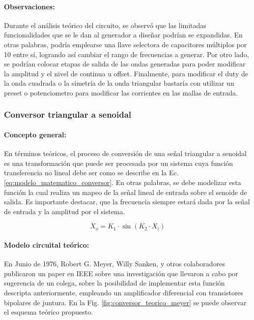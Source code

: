 \paragraph{Observaciones:} Durante el an\'alisis te\'orico del circuito, se observ\'o que las limitadas funcionalidades que se le dan al generador a dise\~nar podr\'ian se expandidas. En otras palabras,
podr\'ia emplearse una llave selectora de capacitores m\'ultiplos por 10 entre s\'i, logrando as\'i cambiar el rango de frecuencias a generar. Por otro lado, se podr\'ian colocar etapas de salida de las ondas
generadas para poder modificar la amplitud y el nivel de continua u offset. Finalmente, para modificar el duty de la onda cuadrada o la simetr\'ia de la onda triangular bastar\'ia
con utilizar un preset o potenciometro para modificar las corrientes en las mallas de entrada.

\subsubsection{Conversor triangular a senoidal}

\paragraph{Concepto general:} En t\'erminos te\'oricos, el proceso de conversi\'on de una se\~nal triangular a senoidal es una transformaci\'on que puede ser procesada por un sistema
cuya funci\'on transferencia no lineal debe ser como se describe en la Ec. \ref{eq:modelo_matematico_conversor}. En otras palabras, se debe modelizar esta funci\'on la cual realiza
un mapeo de la se\~nal lineal de entrada sobre el senoide de salida. Es importante destacar, que la frecuencia siempre estar\'a dada por la se\~nal de entrada y la amplitud por el sistema.

\begin{equation}
    X_o = K_1 \cdot \sin{(K_2 \cdot X_i)}
    \label{eq:modelo_matematico_conversor}
\end{equation}

\paragraph{Modelo circuital te\'orico:} En Junio de 1976, Robert G. Meyer, Willy Sanken, y otros colaboradores publicaron un paper en IEEE sobre una investigaci\'on que llevaron a cabo por sugerencia de un colega, sobre la posibilidad de implementar esta funci\'on
descripta anteriormente, empleando un amplificador diferencial con transistores bipolares de juntura. En la Fig. \ref{fig:conversor_teorico_meyer} se puede observar el esquema te\'orico propuesto.

